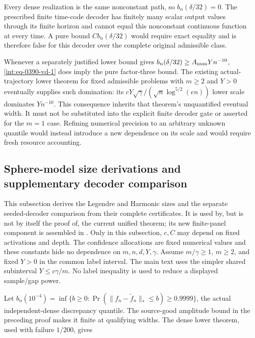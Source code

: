 
Every dense realization is the same nonconstant path, so \(b_n(\delta/32)=0\). The prescribed finite time-code decoder has finitely many scalar output values through its finite horizon and cannot equal this nonconstant continuous function at every time. A pure bound \(C b_n(\delta/32)\) would require exact equality and is therefore false for this decoder over the complete original admissible class.



Whenever a separately justified lower bound gives \(b_n(\delta/32)\ge A_{\rm num}Yn^{-10}\), \eqref{int:eq-0390-vd-1} does imply the pure factor-three bound. The existing actual-trajectory lower theorem for fixed admissible problems with \(m\ge2\) and \(Y>0\) eventually supplies such domination: its \(cY\sqrt\gamma/(\sqrt n\log^{5/2}(en))\) lower scale dominates \(Yn^{-10}\). This consequence inherits that theorem's unquantified eventual width. It must not be substituted into the explicit finite decoder gate or asserted for the \(m=1\) case. Refining numerical precision to an arbitrary unknown quantile would instead introduce a new dependence on its scale and would require fresh resource accounting.


\subsection{Sphere-model size derivations and supplementary decoder comparison}
\label{int:joint-compression-headline-proof}


This subsection derives the Legendre and Harmonic sizes and the separate
seeded-decoder comparison from their complete certificates. It is used by,
but is not by itself the proof of, the current unified theorem; its new
finite-panel component is assembled in .
Only in this subsection, \(c,C\) may depend on fixed activations and depth.
The confidence allocations are fixed numerical values and these constants
hide no dependence on \(m,n,d,Y,\gamma\). Assume \(m/\gamma\ge1\),
\(m\ge2\), and fixed \(Y>0\) in the common label interval. The main
text uses the simpler shared subinterval \(Y\le c\gamma/m\).
No label inequality is used to reduce a displayed sample/gap power.



Let \(b_n(10^{-4})=\inf\{b\ge0:\Pr(\|f_n-\widetilde f_n\|_*\le b)\ge0.9999\}\), the actual independent-dense discrepancy quantile. The source-good amplitude bound in the preceding proof makes it finite at qualifying widths. The dense lower theorem, used with failure \(1/200\), gives


